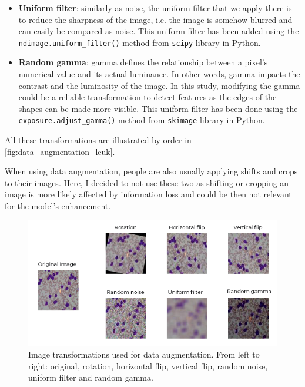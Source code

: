 \documentclass[11pt, openany]{report}
\theoremstyle{plain}
\theoremstyle{definition}
\theoremstyle{remark}
\begin{document}
\begin{itemize}
\item \textbf{Uniform filter}: similarly as noise, the uniform filter that we apply there is to reduce the sharpness of the image, i.e. the image is somehow blurred and can easily be compared as noise. This uniform filter has been added using the \texttt{ndimage.uniform\_filter()} method from \texttt{scipy} library in Python.   

\item \textbf{Random gamma}: gamma defines the relationship between a pixel's numerical value and its actual luminance. In other words, gamma impacts the contrast and the luminosity of the image. In this study, modifying the gamma could be a reliable transformation to detect features as the edges of the shapes can be made more visible. This uniform filter has been done using the \texttt{exposure.adjust\_gamma()} method from \texttt{skimage} library in Python.    
\end{itemize} 

All these transformations are illustrated by order in \autoref{fig:data_augmentation_leuk}.

When using data augmentation, people are also usually applying shifts and crops to their images. Here, I decided to not use these two as shifting or cropping an image is more likely affected by information loss and could be then not relevant for the model's enhancement. 

\begin{figure}[H]
  \centering
  \includegraphics[scale=0.7]{figures/data_augmentation_leuk.PNG}
  \caption{Image transformations used for data augmentation. From left to right: original, rotation, horizontal flip, vertical flip, random noise, uniform filter and random gamma.}
  \label{fig:data_augmentation_leuk}
\end{figure}

\end{document}
